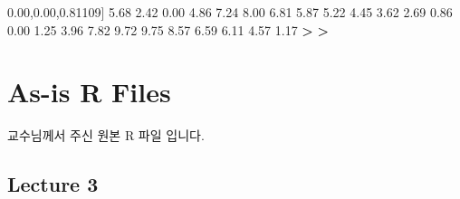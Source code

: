 \documentclass[10pt,]{krantz}
\makeatletter
\newenvironment{Shaded}{\begin{snugshade}}{\end{snugshade}}
\newcommand{\DecValTok}[1]{\textcolor[rgb]{0.00,0.00,0.81}{#1}}
\newcommand{\FloatTok}[1]{\textcolor[rgb]{0.00,0.00,0.81}{#1}}
\newcommand{\StringTok}[1]{\textcolor[rgb]{0.31,0.60,0.02}{#1}}
\newcommand{\OperatorTok}[1]{\textcolor[rgb]{0.81,0.36,0.00}{\textbf{#1}}}
\newcommand{\ErrorTok}[1]{\textcolor[rgb]{0.64,0.00,0.00}{\textbf{#1}}}
\newcommand{\NormalTok}[1]{#1}
\newenvironment{kframe}{%
\medskip{}
\setlength{\fboxsep}{.8em}
 \def\at@end@of@kframe{}%
 \ifinner\ifhmode%
  \def\at@end@of@kframe{\end{minipage}}%
  \begin{minipage}{\columnwidth}%
 \fi\fi%
 \def\FrameCommand##1{\hskip\@totalleftmargin \hskip-\fboxsep
 \colorbox{shadecolor}{##1}\hskip-\fboxsep
     \hskip-\linewidth \hskip-\@totalleftmargin \hskip\columnwidth}%
 \MakeFramed {\advance\hsize-\width
   \@totalleftmargin\z@ \linewidth\hsize
   \@setminipage}}%
 {\par\unskip\endMakeFramed%
 \at@end@of@kframe}
\renewenvironment{Shaded}{\begin{kframe}}{\end{kframe}}
\theoremstyle{definition}
\theoremstyle{definition}
\theoremstyle{remark}
\makeatother
\begin{document}
\begin{Shaded}
\begin{Highlighting}[]
\NormalTok{[}\DecValTok{109}\NormalTok{]  }\FloatTok{5.68}  \FloatTok{2.42}  \FloatTok{0.00}  \FloatTok{4.86}  \FloatTok{7.24}  \FloatTok{8.00}  \FloatTok{6.81}  \FloatTok{5.87}  \FloatTok{5.22}  \FloatTok{4.45}  \FloatTok{3.62}  \FloatTok{2.69}  \FloatTok{0.86}  \FloatTok{0.00}  \FloatTok{1.25}  \FloatTok{3.96}  \FloatTok{7.82}  \FloatTok{9.72}  \FloatTok{9.75}  \FloatTok{8.57}  \FloatTok{6.59}  \FloatTok{6.11}  \FloatTok{4.57}  \FloatTok{1.17}
\OperatorTok{>}\StringTok{ }
\ErrorTok{>}\StringTok{ }
\end{Highlighting}
\end{Shaded}

\chapter{As-is R Files}\label{as-is-r-files}

교수님께서 주신 원본 R 파일 입니다.

\section{Lecture 3}\label{lecture-3}
\end{document}
